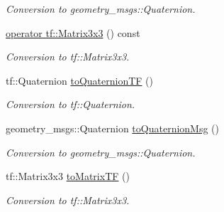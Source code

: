 \begin{DoxyCompactItemize}
\begin{DoxyCompactList}\small\item\em Conversion to geometry\+\_\+msgs\+::\+Quaternion. \end{DoxyCompactList}\item 
\hyperlink{classow__core_1_1AngularPositionRef_a6bc0dc8d7cb5cf31f264024ef1071686}{operator tf\+::\+Matrix3x3} () const \hypertarget{classow__core_1_1AngularPositionRef_a6bc0dc8d7cb5cf31f264024ef1071686}{}\label{classow__core_1_1AngularPositionRef_a6bc0dc8d7cb5cf31f264024ef1071686}

\begin{DoxyCompactList}\small\item\em Conversion to tf\+::\+Matrix3x3. \end{DoxyCompactList}\item 
tf\+::\+Quaternion \hyperlink{classow__core_1_1AngularPositionRef_a7c2c2d8e595fa548b34a4f2f2a093f9c}{to\+Quaternion\+TF} ()\hypertarget{classow__core_1_1AngularPositionRef_a7c2c2d8e595fa548b34a4f2f2a093f9c}{}\label{classow__core_1_1AngularPositionRef_a7c2c2d8e595fa548b34a4f2f2a093f9c}

\begin{DoxyCompactList}\small\item\em Conversion to tf\+::\+Quaternion. \end{DoxyCompactList}\item 
geometry\+\_\+msgs\+::\+Quaternion \hyperlink{classow__core_1_1AngularPositionRef_af3fa191a6e35e4e55f3cc8730936e5da}{to\+Quaternion\+Msg} ()\hypertarget{classow__core_1_1AngularPositionRef_af3fa191a6e35e4e55f3cc8730936e5da}{}\label{classow__core_1_1AngularPositionRef_af3fa191a6e35e4e55f3cc8730936e5da}

\begin{DoxyCompactList}\small\item\em Conversion to geometry\+\_\+msgs\+::\+Quaternion. \end{DoxyCompactList}\item 
tf\+::\+Matrix3x3 \hyperlink{classow__core_1_1AngularPositionRef_a84c7eb3a2bf5883c692ef40b672988fb}{to\+Matrix\+TF} ()\hypertarget{classow__core_1_1AngularPositionRef_a84c7eb3a2bf5883c692ef40b672988fb}{}\label{classow__core_1_1AngularPositionRef_a84c7eb3a2bf5883c692ef40b672988fb}

\begin{DoxyCompactList}\small\item\em Conversion to tf\+::\+Matrix3x3. \end{DoxyCompactList}\end{DoxyCompactItemize}
